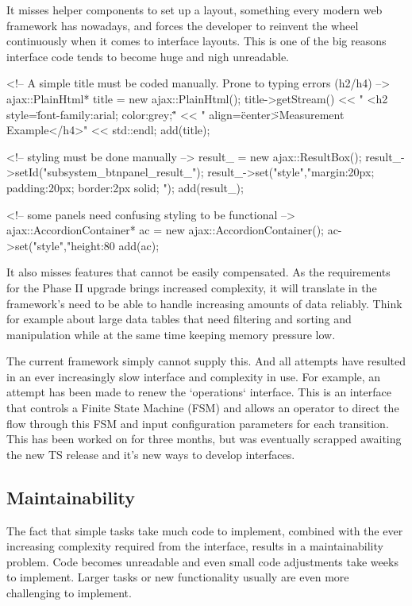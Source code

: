 It misses helper components to set up a layout, something every modern web
framework has nowadays, and forces the developer to reinvent the wheel
continuously when it comes to interface layouts. This is one of the big reasons
interface code tends to become huge and nigh unreadable.

\begin{pyglist}[language=cpp,numbers=left,numbersep=5pt,fontsize=\small]
<!-- A simple title must be coded manually. Prone to typing errors (h2/h4) -->
ajax::PlainHtml* title = new ajax::PlainHtml();
title->getStream() << " <h2 style=\"font-family:arial; color:grey;\"" <<
" align=\"center\">Measurement Example</h4>" << std::endl;
add(title);

<!-- styling must be done manually -->
result_ = new ajax::ResultBox();
result_->setId("subsystem_btnpanel_result_");
result_->set("style","margin:20px; padding:20px; border:2px solid; ");
add(result_);

<!-- some panels need confusing styling to be functional -->
ajax::AccordionContainer* ac = new ajax::AccordionContainer();
ac->set("style","height:80%
add(ac);
\end{pyglist}

It also misses features that cannot be easily compensated. As the requirements
for the Phase II upgrade brings increased complexity, it will translate in the
framework's need to be able to handle increasing amounts of data reliably.
Think for example about large data tables that need filtering and sorting and
manipulation while at the same time keeping memory pressure low.

The current framework simply cannot supply this. And all attempts have resulted
in an ever increasingly slow interface and complexity in use.
For example, an attempt has been made to renew the `operations` interface.
This is an interface that controls a Finite State Machine (FSM) and allows an
operator to direct the flow through this FSM and input configuration parameters
for each transition.
This has been worked on for three months, but was eventually scrapped awaiting
the new TS release and it's new ways to develop interfaces.

\subsection{Maintainability}
The fact that simple tasks take much code to implement, combined with the
ever increasing complexity required from the interface, results in a
maintainability problem. Code becomes unreadable and even small code adjustments
take weeks to implement. Larger tasks or new functionality usually are even more
challenging to implement.

